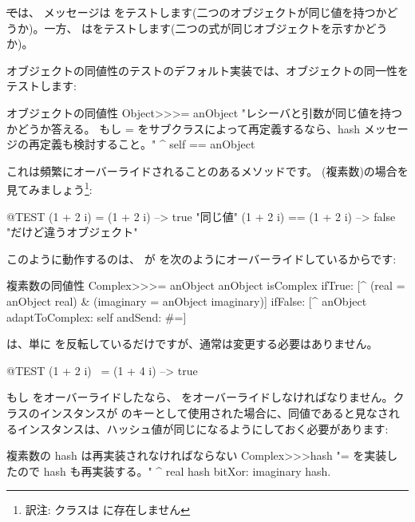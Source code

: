 \documentclass[a4paper,10pt,twoside]{book}
\begin{document}
\st では、\ct{=} メッセージは をテストします(\ie 二つのオブジェクトが同じ値を持つかどうか)。一方、\ct{==} はをテストします(\ie 二つの式が同じオブジェクトを示すかどうか)。

オブジェクトの同値性のテストのデフォルト実装では、オブジェクトの同一性をテストします:
\begin{method}{オブジェクトの同値性}
Object>>>= anObject
    "レシーバと引数が同じ値を持つかどうか答える。
    もし = をサブクラスによって再定義するなら、hash メッセージの再定義も検討すること。"
    ^ self == anObject
\end{method}

これは頻繁にオーバーライドされることのあるメソッドです。 (複素数)の場合を見てみましょう\footnote{訳注:  クラスは  に存在しません}:

\begin{code}{@TEST}
(1 + 2 i) = (1 + 2 i)   --> true     "同じ値"
(1 + 2 i) == (1 + 2 i) --> false    "だけど違うオブジェクト"
\end{code}

このように動作するのは、 が \ct{=} を次のようにオーバーライドしているからです:
\begin{method}{複素数の同値性}
Complex>>>= anObject
    anObject isComplex
        ifTrue: [^ (real = anObject real) & (imaginary = anObject imaginary)]
        ifFalse: [^ anObject adaptToComplex: self andSend: #=]
\end{method}

 は、単に \ct{=} を反転しているだけですが、通常は変更する必要はありません。%

\begin{code}{@TEST}
(1 + 2 i) ~= (1 + 4 i) --> true
\end{code}

もし \ct{=} をオーバーライドしたなら、 をオーバーライドしなければなりません。クラスのインスタンスが  のキーとして使用された場合に、同値であると見なされるインスタンスは、ハッシュ値が同じになるようにしておく必要があります:%
\begin{method}{複素数の hash は再実装されなければならない}
Complex>>>hash
    "= を実装したので hash も再実装する。"
    ^ real hash bitXor: imaginary hash.
\end{method}
\end{document}

